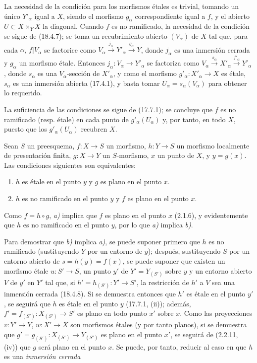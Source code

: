 La necesidad de la condición para los morfismos étales es trivial, tomando un único $Y'_\alpha$ igual a $X$, siendo el morfismo $g_\alpha$ correspondiente igual a $f$, y el abierto $U\subset X\times_Y X$ la diagonal. Cuando $f$ es no ramificado, la necesidad de la condición se sigue de (18.4.7); se toma un recubrimiento abierto $(V_\alpha)$ de $X$ tal que, para cada $\alpha$, $f|V_\alpha$ se factorice como $V_\alpha\xrightarrow{j_\alpha}Y'_\alpha\xrightarrow{g_\alpha}Y$, donde $j_\alpha$ es una inmersión cerrada y $g_\alpha$ un morfismo étale. Entonces $j_\alpha:V_\alpha\to Y'_\alpha$ se factoriza como $V_\alpha\xrightarrow{s_\alpha}X'_\alpha\xrightarrow{f'_\alpha}Y'_\alpha$, donde $s_\alpha$ es una $V_\alpha$-sección de $X'_\alpha$, y como el morfismo $g'_\alpha:X'_\alpha\to X$ es étale, $s_\alpha$ es una inmersión abierta (17.4.1), y basta tomar $U_\alpha=s_\alpha(V_\alpha)$ para obtener lo requerido.

La suficiencia de las condiciones se sigue de (17.7.1); se concluye que $f$ es no ramificado (resp. étale) en cada punto de $g'_\alpha(U_\alpha)$ y, por tanto, en todo $X$, puesto que los $g'_\alpha(U_\alpha)$ recubren $X$.

\begin{proposition}[18.4.9]
\label{IV.18.4.9}
Sean $S$ un preesquema, $f:X\to S$ un morfismo, $h:Y\to S$ un morfismo localmente de presentación finita, $g:X\to Y$ un $S$-morfismo, $x$ un punto de $X$, y $y=g(x)$. Las condiciones siguientes son equivalentes:
\begin{enumerate}
  \item[\textup{a)}] $h$ es étale en el punto $y$ y $g$ es plano en el punto $x$.
  \item[\textup{b)}] $h$ es no ramificado en el punto $y$ y $f$ es plano en el punto $x$.
\end{enumerate}
\end{proposition}

Como $f=h\circ g$, \emph{a)} implica que $f$ es plano en el punto $x$ (2.1.6), y evidentemente que $h$ es no ramificado en el punto $y$, por lo que \emph{a)} implica \emph{b)}.

Para demostrar que \emph{b)} implica \emph{a)}, se puede suponer primero que $h$ es no ramificado (sustituyendo $Y$ por un entorno de $y$); después, sustituyendo $S$ por un entorno abierto de $s=h(y)=f(x)$, se puede suponer que existen un morfismo étale $u:S'\to S$, un punto $y'$ de $Y'=Y_{(S')}$ sobre $y$ y un entorno abierto $V$ de $y'$ en $Y'$ tal que, si $h'=h_{(S')}:Y'\to S'$, la restricción de $h'$ a $V$ sea una inmersión cerrada (18.4.8). Si se demuestra entonces que $h'$ es étale en el punto $y'$, se seguirá que $h$ es étale en el punto $y$ (17.7.1, (ii)); además, $f'=f_{(S')}:X_{(S')}\to S'$ es plano en todo punto $x'$ sobre $x$. Como las proyecciones $v:Y'\to Y$, $w:X'\to X$ son morfismos étales (y por tanto planos), si se demuestra que $g'=g_{(S')}:X_{(S')}\to Y_{(S')}$ es plano en el punto $x'$, se seguirá de (2.2.11, (iv)) que $g$ será plano en el punto $x$. Se puede, por tanto, reducir al caso en que $h$ es una \emph{inmersión cerrada}


